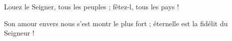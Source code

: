 \item Louez le Seigner, tous les peuples ;\psstar{} fêtez-l, tous les pays !
\item Son amour envers nous s’est montr le plus fort ;\psstar{} éternelle est la fidélit du Seigneur !